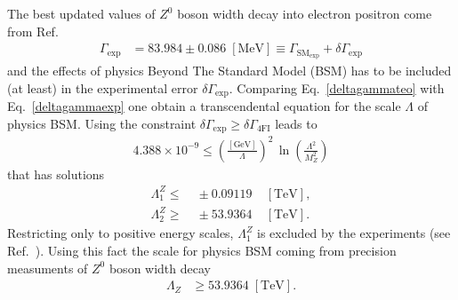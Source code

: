 The best updated values of $Z^0$ boson width decay into electron positron come from Ref.~\cite{Beringer:1900zz}
\begin{align}
\label{deltagammaexp}
 \Gamma_{\text{exp}} &= 83.984 \pm 0.086\;[\text{MeV}] \equiv \Gamma_{\text{SM}_\text{exp}} + \delta\Gamma_{\text{exp}}
\end{align}
and the effects of physics Beyond The Standard Model (BSM) has to be included (at least) in the experimental error $\delta\Gamma_{\text{exp}}$. Comparing Eq.~\eqref{deltagammateo} with Eq.~\eqref{deltagammaexp} one obtain a transcendental equation for the scale $\Lambda$ of physics BSM. Using the constraint $\delta\Gamma_{\text{exp}} \geq \delta\Gamma_{\text{4FI}}$ leads to
\begin{align}
\label{trascendental}
4.388\times10^{-9}\leq\left(\frac{[\text{GeV}]}{\Lambda}\right)^2\,\ln\left(\frac{\Lambda^2}{M_Z^2}\right)
\end{align}
that has solutions
\begin{eqnarray}
 \label{lowscalefromz}
 \Lambda_1^{Z} \leq&\; \pm0.09119\;&[\text{TeV}], \\
 \label{upscalefromz}
 \Lambda_2^{Z} \geq&\; \pm53.9364\;&[\text{TeV}].
\end{eqnarray}
Restricting only to positive energy scales, $\Lambda_1^Z$ is excluded by the experiments (see Ref.~\cite{Chatrchyan:2013muj}). Using this fact the scale for physics BSM coming from precision measuments of $Z^0$ boson width decay
\begin{align}
 \Lambda_Z &\geq 53.9364\;[\text{TeV}].
\end{align}

